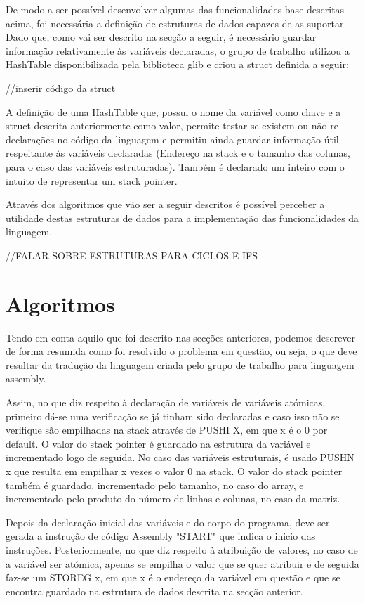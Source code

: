 \documentclass{report}
\begin{document}
De modo a ser possível desenvolver algumas das funcionalidades base descritas acima, foi necessária a definição de estruturas de dados capazes de as suportar. Dado que, como vai ser descrito na secção a seguir, é necessário guardar informação relativamente às variáveis declaradas, o grupo de trabalho utilizou a HashTable disponibilizada pela biblioteca glib e criou a struct definida a seguir: 

//inserir código da struct

A definição de uma HashTable que, possui o nome da variável como chave e a struct descrita anteriormente como valor, permite testar se existem ou não re-declarações no código da linguagem e permitiu ainda guardar informação útil respeitante às variáveis declaradas (Endereço na stack e o tamanho das colunas, para o caso das variáveis estruturadas). Também é declarado um inteiro com o intuito de  representar um stack pointer.

Através dos algoritmos que vão ser a seguir descritos é possível perceber a utilidade destas estruturas de dados para a implementação das funcionalidades da linguagem. 

//FALAR SOBRE ESTRUTURAS PARA CICLOS E IFS

\section{Algoritmos}

Tendo em conta aquilo que foi descrito nas secções anteriores, podemos descrever de forma resumida como foi resolvido o problema em questão, ou seja, o que deve resultar da tradução da linguagem criada pelo  grupo de trabalho para linguagem assembly.  

Assim, no que diz respeito à declaração de variáveis de variáveis atómicas, primeiro dá-se uma verificação se já tinham sido declaradas e caso isso não se verifique são empilhadas na stack através de PUSHI X, em que x é o 0 por default. O valor do stack pointer é guardado na estrutura da variável e incrementado logo de seguida. No caso das variáveis estruturais, é usado PUSHN x que resulta em empilhar x vezes o valor 0 na stack.  O valor do stack pointer também é guardado, incrementado pelo tamanho, no caso do array, e incrementado pelo produto do número de linhas e colunas, no caso da matriz. 

Depois da declaração inicial das variáveis e do corpo do programa, deve ser gerada a instrução de código Assembly "START" que indica o inicio das instruções. 
Posteriormente, no que diz respeito à atribuição de valores, no caso de a variável ser atómica, apenas se empilha o valor que se quer atribuir e de seguida faz-se um STOREG x, em que x é o endereço da variável em questão e que se encontra guardado na estrutura de dados descrita na secção anterior.
\end{document}
